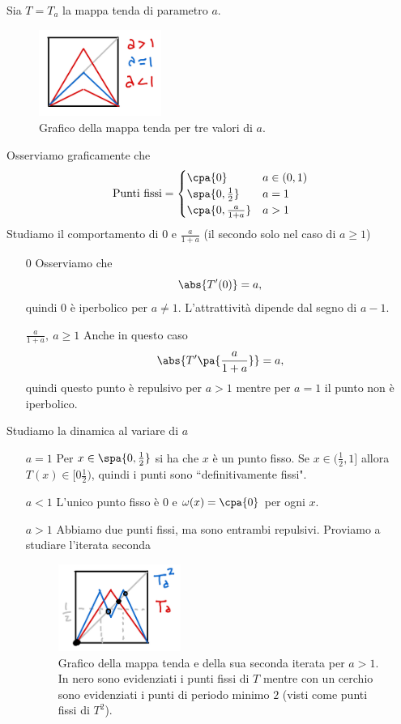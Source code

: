\begin{example}
Sia $T=T_a$ la mappa tenda di parametro $a$. 
\begin{figure}[!htb]
    \centering
    \includegraphics[width=4cm]{Immagini/Tipi_mappa_tenda.png}
    \caption{Grafico della mappa tenda per tre valori di $a$.}
\end{figure}

\noindent
Osserviamo graficamente che 
\[\text{Punti fissi}=\begin{cases}
\cpa{0} &a\in (0,1)\\
\spa{0,\frac12} &a=1\\
\cpa{0,\frac a{1+a}} &a>1
\end{cases}\]
Studiamo il comportamento di $0$ e $\frac a{1+a}$ (il secondo solo nel caso di $a\geq 1$)
\setlength{\leftmargini}{0cm}
\begin{itemize}
\item[$\boxed{0}$] Osserviamo che
\[\abs{T'(0)}=a,\]
quindi $0$ \`e iperbolico per $a\neq 1$. L'attrattivit\`a dipende dal segno di $a-1$.
\item[$\boxed{\frac a{1+a},\ a\geq 1}$] Anche in questo caso
\[\abs{T'\pa{\frac a{1+a}}}=a,\]
quindi questo punto \`e repulsivo per $a>1$ mentre per $a=1$ il punto non \`e iperbolico.
\end{itemize}
\setlength{\leftmargini}{0.5cm}
Studiamo la dinamica al variare di $a$
\setlength{\leftmargini}{0cm}
\begin{itemize}
\item[$\boxed{a=1}$] Per $x\in \spa{0,\frac12}$ si ha che $x$ \`e un punto fisso. Se $x\in (\frac12,1]$ allora $T(x)\in [0\frac12)$, quindi i punti sono ``definitivamente fissi".
\item[$\boxed{a<1}$] L'unico punto fisso \`e $0$ e $\omega(x)=\cpa{0}$ per ogni $x$.
\item[$\boxed{a>1}$] Abbiamo due punti fissi, ma sono entrambi repulsivi. Proviamo a studiare l'iterata seconda
\begin{figure}[!htb]
    \centering
    \includegraphics[width=4cm]{Immagini/mappa_tenda_iterata.png}
    \caption{Grafico della mappa tenda e della sua seconda iterata per $a>1$. In nero sono evidenziati i punti fissi di $T$ mentre con un cerchio sono evidenziati i punti di periodo minimo $2$ (visti come punti fissi di $T^2$).}
\end{figure}


\end{itemize}
\end{example}
